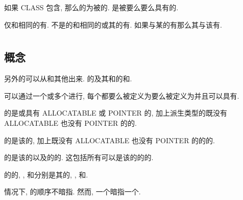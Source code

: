 如果 CLASS \TypeSpecifier{}包含\Type{}\Name{}, 那么\Polymorphic{}\Entity{}的\DeclaredType{}为被\Specify{}的\Type{}. \DeclaredType{}是\Data{}\Entity{}被要么\Explicitly{}要么\Implicitly{}\Declare{}具有的\Type{}.

\Nonpolymorphic{}\Entity{}仅和相同\DeclaredType{}的\Entity{}有\Type{}\Compatibility{}. 不是\UnlimitedPolymorphic{}\Entity{}的\Polymorphic{}\Entity{}和相同\DeclaredType{}的或其\Extension{}的\Entity{}有\Type{}\Compatibility{}. 如果\Entity{}与某\Type{}的\Entity{}有\Type{}\Compatibility{}那么其与该\Type{}有\Type{}\Compatibility{}.

\section{\DerivedType{}}

\subsection{\DerivedType{}概念}

另外的\Type{}可以从\IntrinsicType{}和其他\DerivedType{}\Derive{}出来. \Type{}\Definition{}\Define{}\Type{}的\Name{}及其\Component{}和\TypeBoundProcedure{}的\Name{}和\Attribute{}.

\DerivedType{}可以通过一个或多个\TypeParameter{}进行\Parameterize{}, 每个\TypeParameter{}都要么被定义为\Kind{}\TypeParameter{}要么被定义为\Length{}\TypeParameter{}并且可以具有\Default{}\Value{}.

\DerivedType{}的\UltimateComponent{}是\IntrinsicType{}或具有 ALLOCATABLE \Attribute{}或 POINTER \Attribute{}的\Component{}, 加上派生类型的既没有 ALLOCATABLE \Attribute{}也没有 POINTER \Attribute{}的\Component{}的\UltimateComponent{}.

\DerivedType{}的\DirectComponent{}是该\Type{}的\Component{}, 加上既没有 ALLOCATABLE \Attribute{}也没有 POINTER \Attribute{}的\DerivedType{}的\Component{}的\DirectComponent{}.

\DerivedType{}的\PotentialSubobjectComponent{}是该\Type{}的\Nonpointer{}\Component{}以及\DerivedType{}的\Nonpointer{}\Component{}的\PotentialSubobjectComponent{}. 这包括所有可以是该\Type{}的\Object{}的\Subobject{}的\Component{}.

\DerivedType{}的\Object{}的\Component{}, \DirectComponent{}, \PotentialSubobjectComponent{}和\UltimateComponent{}分别是其\Type{}的\Component{}, \DirectComponent{}, \PotentialSubobjectComponent{}和\UltimateComponent{}.

\Default{}情况下, \Component{}\Definition{}的顺序不暗指\Storage{}\Sequence{}. 然而, 一个\Sequence{}\Type{}暗指一个\Storage{}\Sequence{}.

